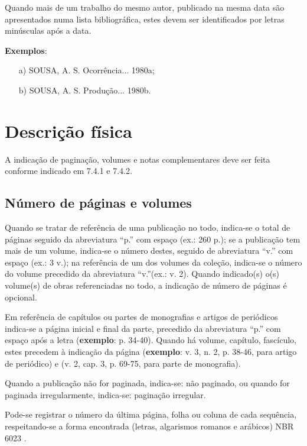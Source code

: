 Quando mais de um trabalho do mesmo autor, publicado na mesma data são apresentados numa lista bibliográfica, estes devem ser identificados por letras minúsculas após a data.

\begin{exemplomanual}
\textbf{Exemplos}:

\begin{enumerate}[a)]
  \item[a)] SOUSA, A. S. Ocorrência... 1980a;
  \item[b)] SOUSA, A. S. Produção... 1980b. 
\end{enumerate}
\end{exemplomanual}


\section{Descrição física}

A indicação de paginação, volumes e notas complementares deve ser feita conforme indicado em 7.4.1 e 7.4.2.


\subsection{Número de páginas e volumes}

Quando se tratar de referência de uma publicação no todo, indica-se o total de páginas seguido da abreviatura ``p.'' com espaço (ex.: 260 p.); se a publicação tem mais de um volume, indica-se o número destes, seguido de abreviatura ``v.'' com espaço (ex.: 3 v.); na referência de um dos volumes da coleção, indica-se o número do volume precedido da abreviatura ``v.''(ex.: v. 2). Quando indicado(s) o(s) volume(s) de obras referenciadas no todo, a indicação de número de páginas é opcional.

Em referência de capítulos ou partes de monografias e artigos de periódicos indica-se a página inicial e final da parte, precedido da abreviatura ``p.'' com espaço após a letra (\textbf{exemplo}: p. 34-40). Quando há volume, capítulo, fascículo, estes precedem à indicação da página (\textbf{exemplo}: v. 3, n. 2, p. 38-46, para artigo de periódico) e (v. 2, cap. 3, p. 69-75, para parte de monografia).

Quando a publicação não for paginada, indica-se: não paginado, ou quando for paginada irregularmente, indica-se: paginação irregular.

Pode-se registrar o número da última página, folha ou coluna de cada sequência, respeitando-se a forma encontrada (letras, algarismos romanos e arábicos) NBR 6023 \cite{NBR6023:2002}.

